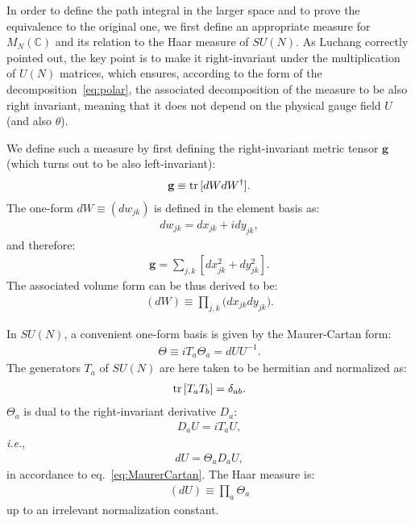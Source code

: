 \documentclass[12pt]{article}
\begin{document}
In order to define the path integral in the larger space
and to prove the equivalence to the original one,
we first define an appropriate measure for $M_N(\mathbb{C})$
and its relation to the Haar measure of $SU(N)$.
As Luchang correctly pointed out,
the key point is to make it right-invariant under
the multiplication of $U(N)$ matrices,
which ensures, according to the form of the decomposition~\eqref{eq:polar},
the associated decomposition of the measure to be also right invariant,
meaning that it does not depend on the physical gauge field $U$
(and also $\theta$).

We define such a measure by
first defining the right-invariant metric tensor $\textbf{g}$
(which turns out to be also left-invariant):
\begin{align}
  \textbf{g}
  \equiv
  {\rm tr}\, [dW dW^\dagger].
\end{align}
The one-form $dW\equiv (dw_{jk})$ is defined in the element basis as:
\begin{align}
  dw_{jk} = dx_{jk} + i dy_{jk},
\end{align}
and therefore:
\begin{align}
  \textbf{g}
  =
  \sum_{j,k}[dx_{jk}^2 + dy_{jk}^2].
\end{align}
The associated volume form can be thus derived to be:
\begin{align}
  (dW)
  \equiv
  \prod_{j,k}
  \big(
  dx_{jk} dy_{jk}
  \big).
  \label{eq:measure_flat}
\end{align}

In $SU(N)$, a convenient one-form basis
is given by the Maurer-Cartan form:
\begin{align}
  \Theta \equiv i T_a \Theta_a = dU U^{-1}. \label{eq:MaurerCartan}
\end{align}
The generators $T_a$ of $SU(N)$ are here taken to be hermitian and normalized as:
\begin{align}
  {\rm tr}\,[T_a T_b] = \delta_{ab}.
\end{align}
$\Theta_a$ is dual to the right-invariant derivative $D_a$:
\begin{align}
  D_a U = i T_a U,
\end{align}
{\it i.e.},
\begin{align}
  dU = \Theta_a D_a U,
\end{align}
in accordance to eq.~\eqref{eq:MaurerCartan}.
The Haar measure is:
\begin{align}
  (dU) \equiv \prod_a \Theta_a
\end{align}
up to an irrelevant normalization constant.
\end{document}
